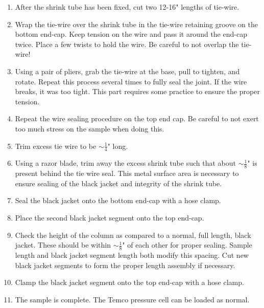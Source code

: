 \begin{enumerate}
\item{After the shrink tube has been fixed, cut two 12-16" lengths of tie-wire.}

\item{Wrap the tie-wire over the shrink tube in the tie-wire retaining groove on the bottom end-cap.  Keep tension on the wire and pass it around the end-cap twice.  Place a few twists to hold the wire.  Be careful to not overlap the tie-wire!}

\item{Using a pair of pliers, grab the tie-wire at the base, pull to tighten, and rotate.  Repeat this process several times to fully seal the joint.  If the wire breaks, it was too tight.  This part requires some practice to ensure the proper tension.}

\item{Repeat the wire sealing procedure on the top end cap.  Be careful to not exert too much stress on the sample when doing this.}

\item{Trim excess tie wire to be $\sim \frac{1}{4}$" long.}

\item{Using a razor blade, trim away the excess shrink tube such that about  $\sim \frac{1}{8}$" is present behind the tie wire seal.  This metal surface area is necessary to ensure sealing of the black jacket and integrity of the shrink tube.}

\item{Seal the black jacket onto the bottom end-cap with a hose clamp.}

\item{Place the second black jacket segment onto the top end-cap.}

\item{Check the height of the column as compared to a normal, full length, black jacket.  These should be within  $\sim \frac{1}{8}$" of each other for proper sealing.  Sample length and black jacket segment length both modify this spacing.  Cut new black jacket segments to form the proper length assembly if necessary.}

\item{Clamp the black jacket segment onto the top end-cap with a hose clamp.}

\item{The sample is complete.  The Temco pressure cell can be loaded as normal.}

\end{enumerate}

